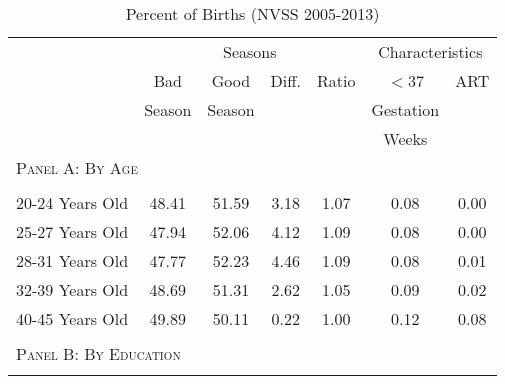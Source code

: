 \documentclass[a4paper, 11.5 pt]{article}
\theoremstyle{plain}
\begin{document}
\begin{doublespace}
\begin{table}[htpb!]\caption{Percent of Births (NVSS 2005-2013)}
\label{bqTab:singleSum}\begin{center}\begin{tabular}{lcccccc}
\toprule \toprule
& \multicolumn{4}{c}{Seasons} & \multicolumn{2}{c}{Characteristics} \\ \cmidrule(r){2-5} \cmidrule(r){6-7}
& Bad    & Good   & Diff. & Ratio & $< $37 & ART \\
& Season & Season &       &       & Gestation  & \\
&     &   &       &       & Weeks  &     \\\midrule\multicolumn{5}{l}{\textsc{Panel A: By Age}}\\
\begin{footnotesize}\end{footnotesize}&
\begin{footnotesize}\end{footnotesize}&
\begin{footnotesize}\end{footnotesize}&
\begin{footnotesize}\end{footnotesize}&
\begin{footnotesize}\end{footnotesize}\\
20-24 Years Old&48.41&51.59&3.18&1.07&0.08&0.00
\\
25-27 Years Old&47.94&52.06&4.12&1.09&0.08&0.00
\\
28-31 Years Old&47.77&52.23&4.46&1.09&0.08&0.01
\\
32-39 Years Old&48.69&51.31&2.62&1.05&0.09&0.02
\\
40-45 Years Old&49.89&50.11&0.22&1.00&0.12&0.08
\\
 &&&&&& \\\multicolumn{7}{l}{\textsc{Panel B: By Education}}\\
\begin{footnotesize}\end{footnotesize}&
\begin{footnotesize}\end{footnotesize}&
\begin{footnotesize}\end{footnotesize}&
\begin{footnotesize}\end{footnotesize}&
\begin{footnotesize}\end{footnotesize}\\

\end{tabular}
\end{center}
\end{table}
\end{doublespace}
\end{document}
